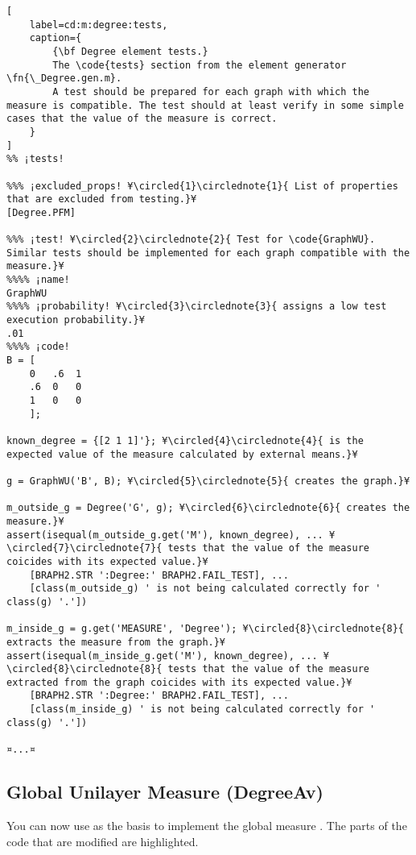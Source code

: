 \documentclass{tufte-handout}
\begin{document}
\begin{lstlisting}[
	label=cd:m:degree:tests,
	caption={
		{\bf Degree element tests.}
		The \code{tests} section from the element generator \fn{\_Degree.gen.m}.
		A test should be prepared for each graph with which the measure is compatible. The test should at least verify in some simple cases that the value of the measure is correct.
	}
]
%% ¡tests!

%%% ¡excluded_props! ¥\circled{1}\circlednote{1}{ List of properties that are excluded from testing.}¥
[Degree.PFM] 

%%% ¡test! ¥\circled{2}\circlednote{2}{ Test for \code{GraphWU}. Similar tests should be implemented for each graph compatible with the measure.}¥
%%%% ¡name!
GraphWU
%%%% ¡probability! ¥\circled{3}\circlednote{3}{ assigns a low test execution probability.}¥
.01
%%%% ¡code!
B = [
    0   .6  1
    .6  0   0
    1   0   0
    ];

known_degree = {[2 1 1]'}; ¥\circled{4}\circlednote{4}{ is the expected value of the measure calculated by external means.}¥

g = GraphWU('B', B); ¥\circled{5}\circlednote{5}{ creates the graph.}¥

m_outside_g = Degree('G', g); ¥\circled{6}\circlednote{6}{ creates the measure.}¥
assert(isequal(m_outside_g.get('M'), known_degree), ... ¥\circled{7}\circlednote{7}{ tests that the value of the measure coicides with its expected value.}¥ 
    [BRAPH2.STR ':Degree:' BRAPH2.FAIL_TEST], ...
    [class(m_outside_g) ' is not being calculated correctly for ' class(g) '.'])

m_inside_g = g.get('MEASURE', 'Degree'); ¥\circled{8}\circlednote{8}{ extracts the measure from the graph.}¥
assert(isequal(m_inside_g.get('M'), known_degree), ... ¥\circled{8}\circlednote{8}{ tests that the value of the measure extracted from the graph coicides with its expected value.}¥
    [BRAPH2.STR ':Degree:' BRAPH2.FAIL_TEST], ...
    [class(m_inside_g) ' is not being calculated correctly for ' class(g) '.'])

¤...¤
\end{lstlisting}

\clearpage
\subsection{Global Unilayer Measure (DegreeAv)}

You can now use  as the basis to implement the global measure .
{%
The parts of the code that are modified are highlighted.
}%
\end{document}
